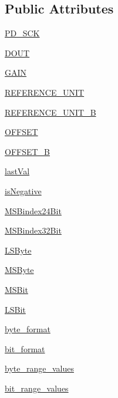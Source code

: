 \subsection*{Public Attributes}
\begin{DoxyCompactItemize}
\item 
\hyperlink{classhx711_1_1HX711_afb0aebbeaeb2bfdc59765a6291c8c723}{P\+D\+\_\+\+S\+CK}
\item 
\hyperlink{classhx711_1_1HX711_a8ddc0f5c5dbbb14a6506dfe4d0caf649}{D\+O\+UT}
\item 
\hyperlink{classhx711_1_1HX711_af4c5016a5debbbc16a42b193b01a011a}{G\+A\+IN}
\item 
\hyperlink{classhx711_1_1HX711_af18a405dc2ca2ab2e34da260df04b568}{R\+E\+F\+E\+R\+E\+N\+C\+E\+\_\+\+U\+N\+IT}
\item 
\hyperlink{classhx711_1_1HX711_a8657198fce62528681bc163b88c17b58}{R\+E\+F\+E\+R\+E\+N\+C\+E\+\_\+\+U\+N\+I\+T\+\_\+B}
\item 
\hyperlink{classhx711_1_1HX711_aff9d6b63880197a431024bd2cb9cf67c}{O\+F\+F\+S\+ET}
\item 
\hyperlink{classhx711_1_1HX711_aa8f2856f3ae54da38d36449bb8415af6}{O\+F\+F\+S\+E\+T\+\_\+B}
\item 
\hyperlink{classhx711_1_1HX711_ad102b78ba1e5328758efa22abda4507b}{last\+Val}
\item 
\hyperlink{classhx711_1_1HX711_a3933fbf89b2a32a60b945f6c3e7892b2}{is\+Negative}
\item 
\hyperlink{classhx711_1_1HX711_ad5f131ac974f065ab08b87266ade0d59}{M\+S\+Bindex24\+Bit}
\item 
\hyperlink{classhx711_1_1HX711_aae2bdf714cce6fe373e9dea4fedd03a4}{M\+S\+Bindex32\+Bit}
\item 
\hyperlink{classhx711_1_1HX711_a1e5b780cbbd9329dfbd4b216bfec0246}{L\+S\+Byte}
\item 
\hyperlink{classhx711_1_1HX711_a71a21ddc6866ec44cd124aace33f8226}{M\+S\+Byte}
\item 
\hyperlink{classhx711_1_1HX711_a8190dc1a747a6b8eece571aa3e638665}{M\+S\+Bit}
\item 
\hyperlink{classhx711_1_1HX711_a23cf4cd354d432c9be2472cbbb586f2f}{L\+S\+Bit}
\item 
\hyperlink{classhx711_1_1HX711_adbea87f8936ada715b6ae5687c1e7de3}{byte\+\_\+format}
\item 
\hyperlink{classhx711_1_1HX711_a1c6c038b6fd49fd9ba1dd29122f53a76}{bit\+\_\+format}
\item 
\hyperlink{classhx711_1_1HX711_a3d42d43137d9b309ac8ff82d4e78e1e6}{byte\+\_\+range\+\_\+values}
\item 
\hyperlink{classhx711_1_1HX711_a0ad3d57b4f0ea29d1f618cb7d7470224}{bit\+\_\+range\+\_\+values}
\end{DoxyCompactItemize}


